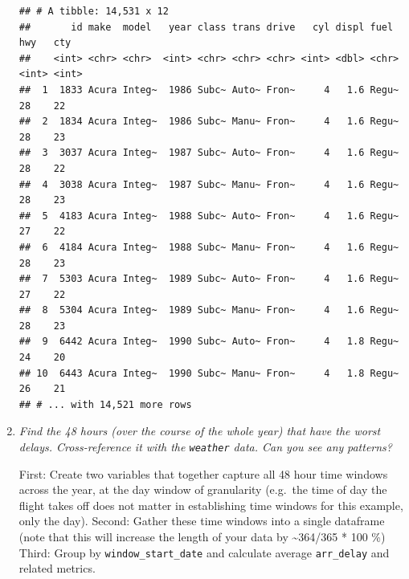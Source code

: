 \documentclass[]{book}
\theoremstyle{definition}
\theoremstyle{definition}
\theoremstyle{definition}
\theoremstyle{remark}
\begin{document}
\begin{enumerate}
\begin{verbatim}
## # A tibble: 14,531 x 12
##       id make  model   year class trans drive   cyl displ fuel    hwy   cty
##    <int> <chr> <chr>  <int> <chr> <chr> <chr> <int> <dbl> <chr> <int> <int>
##  1  1833 Acura Integ~  1986 Subc~ Auto~ Fron~     4   1.6 Regu~    28    22
##  2  1834 Acura Integ~  1986 Subc~ Manu~ Fron~     4   1.6 Regu~    28    23
##  3  3037 Acura Integ~  1987 Subc~ Auto~ Fron~     4   1.6 Regu~    28    22
##  4  3038 Acura Integ~  1987 Subc~ Manu~ Fron~     4   1.6 Regu~    28    23
##  5  4183 Acura Integ~  1988 Subc~ Auto~ Fron~     4   1.6 Regu~    27    22
##  6  4184 Acura Integ~  1988 Subc~ Manu~ Fron~     4   1.6 Regu~    28    23
##  7  5303 Acura Integ~  1989 Subc~ Auto~ Fron~     4   1.6 Regu~    27    22
##  8  5304 Acura Integ~  1989 Subc~ Manu~ Fron~     4   1.6 Regu~    28    23
##  9  6442 Acura Integ~  1990 Subc~ Auto~ Fron~     4   1.8 Regu~    24    20
## 10  6443 Acura Integ~  1990 Subc~ Manu~ Fron~     4   1.8 Regu~    26    21
## # ... with 14,521 more rows
\end{verbatim}
\item
  \emph{Find the 48 hours (over the course of the whole year) that have
  the worst} \emph{delays. Cross-reference it with the \texttt{weather}
  data. Can you see any} \emph{patterns?}

  First: Create two variables that together capture all 48 hour time
  windows across the year, at the day window of granularity (e.g.~the
  time of day the flight takes off does not matter in establishing time
  windows for this example, only the day). Second: Gather these time
  windows into a single dataframe (note that this will increase the
  length of your data by \textasciitilde{}364/365 * 100 \%) Third: Group
  by \texttt{window\_start\_date} and calculate average
  \texttt{arr\_delay} and related metrics.


\end{enumerate}
\end{document}
